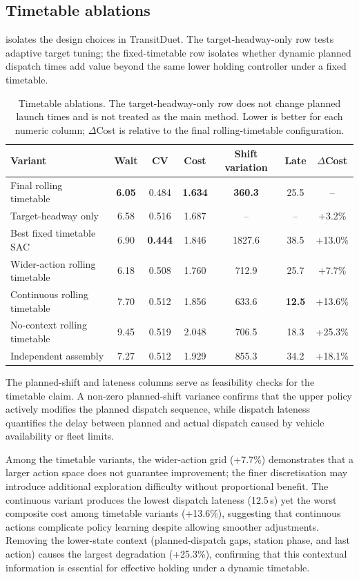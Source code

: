 \subsection{Timetable ablations}
\label{sec:ablation}

 isolates the design choices in TransitDuet. The target-headway-only row tests adaptive target tuning; the fixed-timetable row isolates whether dynamic planned dispatch times add value beyond the same lower holding controller under a fixed timetable.

\begin{table}[H]
\centering
\caption{Timetable ablations. The target-headway-only row does not change planned launch times and is not treated as the main method. Lower is better for each numeric column; $\Delta$Cost is relative to the final rolling-timetable configuration.}
\label{tab:ablations}
\scriptsize
\setlength{\tabcolsep}{2.4pt}
\begin{tabular}{@{}lcccccc@{}}
\toprule
Variant & Wait & CV & Cost & Shift variation & Late & $\Delta$Cost \\
\midrule
Final rolling timetable & \textbf{6.05} & 0.484 & \textbf{1.634} & \textbf{360.3} & 25.5 & -- \\
Target-headway only & 6.58 & 0.516 & 1.687 & -- & -- & +3.2\% \\
Best fixed timetable SAC & 6.90 & \textbf{0.444} & 1.846 & 1827.6 & 38.5 & +13.0\% \\
Wider-action rolling timetable & 6.18 & 0.508 & 1.760 & 712.9 & 25.7 & +7.7\% \\
Continuous rolling timetable & 7.70 & 0.512 & 1.856 & 633.6 & \textbf{12.5} & +13.6\% \\
No-context rolling timetable & 9.45 & 0.519 & 2.048 & 706.5 & 18.3 & +25.3\% \\
Independent assembly & 7.27 & 0.512 & 1.929 & 855.3 & 34.2 & +18.1\% \\
\bottomrule
\end{tabular}
\end{table}

The planned-shift and lateness columns serve as feasibility checks for the timetable claim. A non-zero planned-shift variance confirms that the upper policy actively modifies the planned dispatch sequence, while dispatch lateness quantifies the delay between planned and actual dispatch caused by vehicle availability or fleet limits.

Among the timetable variants, the wider-action grid (+7.7\%) demonstrates that a larger action space does not guarantee improvement; the finer discretisation may introduce additional exploration difficulty without proportional benefit. The continuous variant produces the lowest dispatch lateness (12.5\,s) yet the worst composite cost among timetable variants (+13.6\%), suggesting that continuous actions complicate policy learning despite allowing smoother adjustments. Removing the lower-state context (planned-dispatch gaps, station phase, and last action) causes the largest degradation (+25.3\%), confirming that this contextual information is essential for effective holding under a dynamic timetable.

